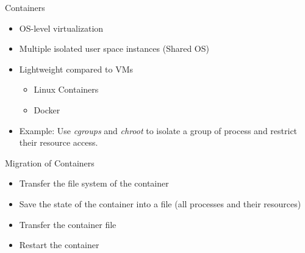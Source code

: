 	\begin{frame}[fragile]{Containers}

		\begin{itemize}
			\setlength \itemsep{0.7em}
			\item OS-level virtualization
			\item Multiple isolated user space instances (Shared OS)
			\item Lightweight compared to VMs
			\begin{itemize}
				\setlength \itemsep{0.3em}
				\item Linux Containers 
				\item Docker 
			\end{itemize}
			\item Example: Use \textit{cgroups} and \textit{chroot} to isolate
a group of process and restrict their resource access.
		\end{itemize}

	\end{frame}

	\begin{frame}[fragile]{Migration of Containers}

		\begin{itemize}
			\setlength \itemsep{0.7em}
			\item Transfer the file system of the container
			\item Save the state of the container into a file (all processes
and their resources)
			\item Transfer the container file
			\item Restart the container
		\end{itemize}

	\end{frame}

